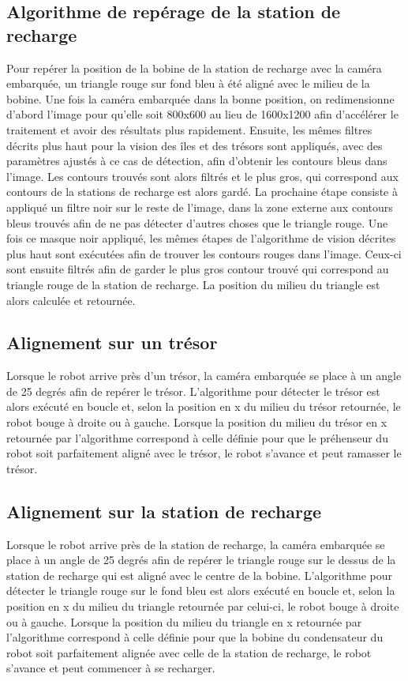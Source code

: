 \subsection{Algorithme de repérage de la station de recharge}
Pour repérer la position de la bobine de la station de recharge avec la caméra embarquée, un triangle rouge sur fond bleu à été aligné avec le milieu de la bobine. Une fois la caméra embarquée dans la bonne position, on redimensionne d'abord l'image pour qu'elle soit 800x600 au lieu de 1600x1200 afin d'accélérer le traitement et avoir des résultats plus rapidement. Ensuite, les mêmes filtres décrits plus haut pour la vision des îles et des trésors sont appliqués, avec des paramètres ajustés à ce cas de détection, afin d'obtenir les contours bleus dans l'image. Les contours trouvés sont alors filtrés et le plus gros, qui correspond aux contours de la stations de recharge est alors gardé. La prochaine étape consiste à appliqué un filtre noir sur le reste de l'image, dans la zone externe aux contours bleus trouvés afin de ne pas détecter d'autres choses que le triangle rouge. Une fois ce masque noir appliqué, les mêmes étapes de l'algorithme de vision décrites plus haut sont exécutées afin de trouver les contours rouges dans l'image. Ceux-ci sont ensuite filtrés afin de garder le plus gros contour trouvé qui correspond au triangle rouge de la station de recharge. La position du milieu du triangle est alors calculée et retournée.

\subsection{Alignement sur un trésor}
Lorsque le robot arrive près d'un trésor, la caméra embarquée se place à un angle de 25 degrés afin de repérer le trésor. L'algorithme pour détecter le trésor est alors exécuté en boucle et, selon la position en x du milieu du trésor retournée, le robot bouge à droite ou à gauche. Lorsque la position du milieu du trésor en x retournée par l'algorithme correspond à celle définie pour que le préhenseur du robot soit parfaitement aligné avec le trésor, le robot s'avance et peut ramasser le trésor.


\subsection{Alignement sur la station de recharge}
Lorsque le robot arrive près de la station de recharge, la caméra embarquée se place à un angle de 25 degrés afin de repérer le triangle rouge sur le dessus de la station de recharge qui est aligné avec le centre de la bobine. L'algorithme pour détecter le triangle rouge sur le fond bleu est alors exécuté en boucle et, selon la position en x du milieu du triangle retournée par celui-ci, le robot bouge à droite ou à gauche. Lorsque la position du milieu du triangle en x retournée par l'algorithme correspond à celle définie pour que la bobine du condensateur du robot soit parfaitement alignée avec celle de la station de recharge, le robot s'avance et peut commencer à se recharger.
